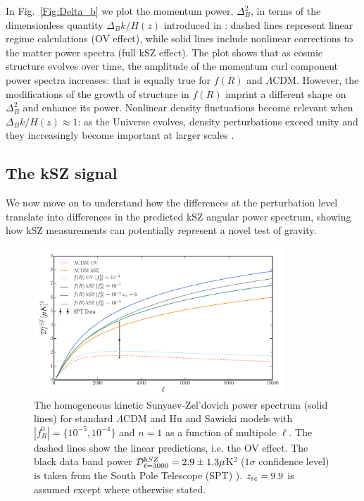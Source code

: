 In Fig.~\eqref{Fig:Delta_b} we plot the momentum power, $\Delta^2_B$, in terms of the dimensionless quantity $\Delta_Bk/H(z)$ introduced in \cite{Zhang2004,Shaw2012}: dashed lines represent linear regime calculations (OV effect), while solid lines include nonlinear corrections to the matter power spectra (full kSZ effect). 
The plot shows that as cosmic structure evolves over time, the amplitude of the momentum curl component power spectra increases: that is equally true for $f(R)$ and $\Lambda$CDM. However, the modifications of the growth of structure in $f(R)$  imprint a different shape on $\Delta^2_B$ and enhance its power. Nonlinear density fluctuations become relevant when $\Delta_Bk/H(z) \approx 1$: as the Universe evolves, density perturbations exceed unity and they increasingly become important at larger scales \citep{Zhang2004}. 

\subsection{The kSZ signal}
We now move on to understand how the differences at the perturbation level translate into differences in the predicted kSZ angular power spectrum, showing how kSZ measurements can potentially represent a novel test of gravity.

\begin{figure}[th]
\begin{center}
\includegraphics[width=0.84\textwidth]{Chapter6/Images/Dl_ksz}
\caption{The homogeneous kinetic Sunyaev-Zel'dovich power spectrum (solid lines) for standard $\Lambda$CDM and Hu and Sawicki models with $|f^0_R|=\{10^{-5},10^{-4}\}$ and $n=1$ as a function of multipole $\ell$. The dashed lines show the linear predictions, i.e. the OV effect. The black data band power $\mathcal{D}^{\rm kSZ}_{\ell=3000} = 2.9 \pm 1.3 \mu$K$^2$ ($1\sigma$ confidence level) is taken from the South Pole Telescope (SPT) \cite{George2015}). $z_{\rm re} = 9.9$ is assumed except where otherwise stated.} 
\label{Fig:ksz}
\end{center}
\end{figure}

